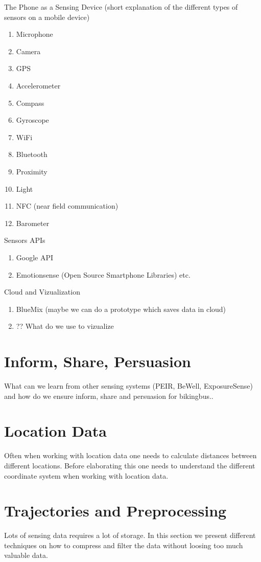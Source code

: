     
\noindent
The Phone as a Sensing Device (short explanation of the different types of sensors on a mobile device)
    \begin{enumerate}
        \item  Microphone

        \item Camera
        
        \item GPS
        \item Accelerometer
        \item Compass
        \item Gyroscope
        \item WiFi
        \item Bluetooth
        \item Proximity
        \item Light
       \item NFC (near field communication)
        \item Barometer
    \end{enumerate}




\noindent
Sensors APIs
    \begin{enumerate}
        \item  Google API
        \item Emotionsense (Open Source Smartphone Libraries) etc. 
    \end{enumerate}

\noindent
Cloud and Vizualization
    \begin{enumerate}
        \item  BlueMix (maybe we can do a prototype which saves data in cloud)
        \item ?? What do we use to vizualize
    \end{enumerate}



\section{Inform, Share, Persuasion}
What can we learn from other sensing systems (PEIR, BeWell, ExposureSense)  and how do we ensure inform, share and persuasion for bikingbus..





\section{Location Data}
Often when working with location data one needs to calculate distances between different locations. Before elaborating this one needs to understand the different coordinate system when working with location data.  


\section{Trajectories and Preprocessing}
Lots of sensing data requires a lot of storage. In this section we present different techniques on how to compress and filter the data without loosing too much valuable data.

